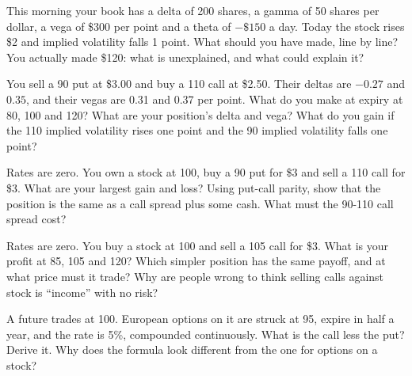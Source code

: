 \begin{question}\label{iq:iv2:options-parity-and-greeks:26}
This morning your book has a delta of 200 shares, a gamma of 50 shares per dollar, a vega of \$300 per point and a theta of $-\$150$ a day. Today the stock rises \$2 and implied volatility falls 1 point. What should you have made, line by line? You actually made \$120: what is unexplained, and what could explain it?
\end{question}

\begin{question}\label{iq:iv2:options-parity-and-greeks:27}
You sell a 90 put at \$3.00 and buy a 110 call at \$2.50. Their deltas are $-0.27$ and $0.35$, and their vegas are 0.31 and 0.37 per point. What do you make at expiry at 80, 100 and 120? What are your position's delta and vega? What do you gain if the 110 implied volatility rises one point and the 90 implied volatility falls one point?
\end{question}

\begin{question}\label{iq:iv2:options-parity-and-greeks:28}
Rates are zero. You own a stock at 100, buy a 90 put for \$3 and sell a 110 call for \$3. What are your largest gain and loss? Using put-call parity, show that the position is the same as a call spread plus some cash. What must the 90-110 call spread cost?
\end{question}

\begin{question}\label{iq:iv2:options-parity-and-greeks:29}
Rates are zero. You buy a stock at 100 and sell a 105 call for \$3. What is your profit at 85, 105 and 120? Which simpler position has the same payoff, and at what price must it trade? Why are people wrong to think selling calls against stock is ``income'' with no risk?
\end{question}

\begin{question}\label{iq:iv2:options-parity-and-greeks:30}
A future trades at 100. European options on it are struck at 95, expire in half a year, and the rate is 5\%, compounded continuously. What is the call less the put? Derive it. Why does the formula look different from the one for options on a stock?
\end{question}

